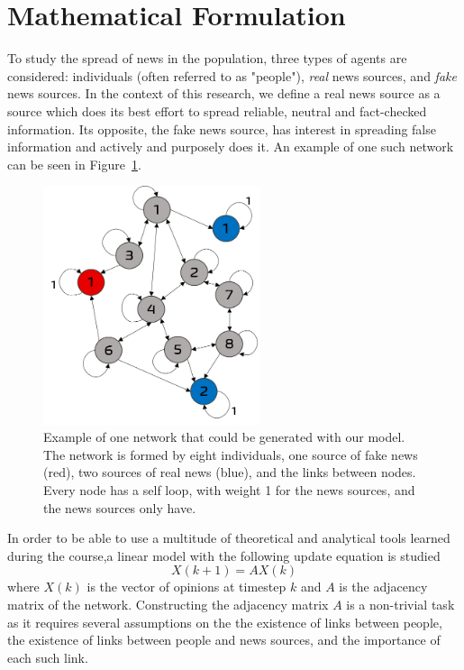 \section{Mathematical Formulation}
To study the spread of news in the population, three types of agents are considered: individuals (often referred to as "people"), \textit{real} news sources, and \textit{fake} news sources. In the context of this research, we define a real news source as a source which does its best effort to spread reliable, neutral and fact-checked information. Its opposite, the fake news source, has interest in spreading false information and actively and purposely does it. An example of one such network can be seen in Figure~\ref{pics:network_example}.

\begin{figure}[!t]
\centering
\includegraphics[width=2.5in]{Figures/network_example.png}
\caption{Example of one network that could be generated with our model. The network is formed by eight individuals, one source of fake news (red), two sources of real news (blue), and the links between nodes. Every node has a self loop, with weight 1 for the news sources, and the news sources only have. }
\label{pics:network_example}
\end{figure}
In order to be able to use a multitude of theoretical and analytical tools learned during the course,a linear model with the following update equation is studied
\begin{equation}
X(k+1) = A X(k)
\end{equation}
where $X(k)$ is the vector of opinions at timestep $k$ and $A$ is the adjacency matrix of the network.
Constructing the adjacency matrix $A$ is a non-trivial task as it requires several assumptions on the the existence of links between people, the existence of links between people and news sources, and the importance of each such link.
